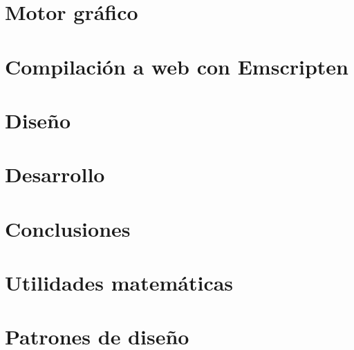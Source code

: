 \documentclass{report}
\begin{document}
\cleardoublepage
\chapter{Motor gráfico}


\cleardoublepage
\chapter{Compilación a web con Emscripten}


\cleardoublepage
\chapter{Diseño}


\cleardoublepage
\chapter{Desarrollo}


\cleardoublepage
\chapter{Conclusiones}

\cleardoublepage
\appendix
\chapter{Utilidades matemáticas}


\chapter{Patrones de diseño}




\end{document}
